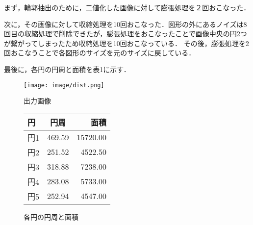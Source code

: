\documentclass[a4paper,11pt]{jsarticle}
\begin{document}
まず，輪郭抽出のために，二値化した画像に対して膨張処理を２回おこなった．

次に，その画像に対して収縮処理を10回おこなった．図形の外にあるノイズは8回目の収縮処理で削除できたが，膨張処理をおこなったことで画像中央の円2つが繋がってしまったため収縮処理を10回おこなっている．
その後，膨張処理を2回おこなうことで各図形のサイズを元のサイズに戻している．

最後に，各円の円周と面積を表1に示す．


\begin{figure}[h]
  \begin{minipage}{0.5\hsize}
    \begin{center}
      \texttt{[image: image/dist.png]}
      \caption{出力画像}

    \end{center}
  \end{minipage}
  \begin{minipage}{0.5\hsize}
    \begin{center}
      \makeatletter
      \def\@captype{table}
      \makeatother
      \caption{各円の円周と面積}
      \begin{tabular}{|l|c|r|}
        \hline
        円  & 円周   & 面積     \\
        \hline
        円1 & 469.59 & 15720.00 \\
        \hline
        円2 & 251.52 & 4522.50  \\
        \hline
        円3 & 318.88 & 7238.00  \\
        \hline
        円4 & 283.08 & 5733.00  \\
        \hline
        円5 & 252.94 & 4547.00  \\
        \hline
      \end{tabular}
    \end{center}
  \end{minipage}
\end{figure}
\end{document}
